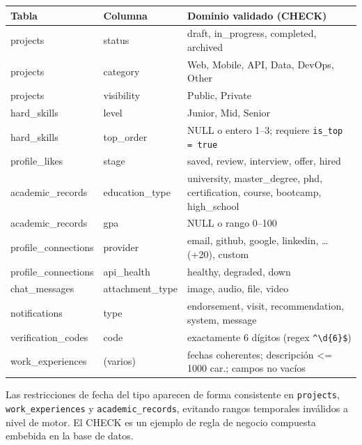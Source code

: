 \clearpage
\vspace{0.2cm}
\noindent
\renewcommand{\arraystretch}{1.3}
\fontsize{8.2}{9.8}\selectfont\sffamily
\begin{tabularx}{\textwidth}{|>{\ttfamily\color{colorPrimario}}l|>{\ttfamily}l|X|}
\hline
\rowcolor{headerTabla}
\sffamily\textbf{Tabla} & \sffamily\textbf{Columna} & \sffamily\textbf{Dominio validado (CHECK)} \\
\hline
projects & status & draft, in\_progress, completed, archived \\
\hline
\rowcolor{grisTecnico}
projects & category & Web, Mobile, API, Data, DevOps, Other \\
\hline
projects & visibility & Public, Private \\
\hline
\rowcolor{grisTecnico}
hard\_skills & level & Junior, Mid, Senior \\
\hline
hard\_skills & top\_order & NULL o entero 1–3; requiere \texttt{is\_top = true} \\
\hline
\rowcolor{grisTecnico}
profile\_likes & stage & saved, review, interview, offer, hired \\
\hline
academic\_records & education\_type & university, master\_degree, phd, certification, course, bootcamp, high\_school \\
\hline
\rowcolor{grisTecnico}
academic\_records & gpa & NULL o rango 0–100 \\
\hline
profile\_connections & provider & email, github, google, linkedin, … (+20), custom \\
\hline
\rowcolor{grisTecnico}
profile\_connections & api\_health & healthy, degraded, down \\
\hline
chat\_messages & attachment\_type & image, audio, file, video \\
\hline
\rowcolor{grisTecnico}
notifications & type & endorsement, visit, recommendation, system, message \\
\hline
verification\_codes & code & exactamente 6 dígitos (regex \texttt{\^{}\textbackslash d\{6\}\$}) \\
\hline
\rowcolor{grisTecnico}
work\_experiences & (varios) & fechas coherentes; descripción <= 1000 car.; campos no vacíos \\
\hline
\end{tabularx}
\label{tab:checks}

\begin{AvisoNota}
Las restricciones de fecha del tipo  aparecen de forma
consistente en \texttt{projects}, \texttt{work\_experiences} y \texttt{academic\_records},
evitando rangos temporales inválidos a nivel de motor. El CHECK
 es un ejemplo de regla de negocio compuesta
embebida en la base de datos.
\end{AvisoNota}
